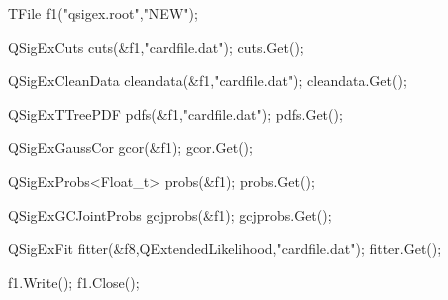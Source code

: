 \begin{boxedverbatim}
TFile f1("qsigex.root","NEW");

QSigExCuts cuts(&f1,"cardfile.dat"); 
cuts.Get();

QSigExCleanData cleandata(&f1,"cardfile.dat");
cleandata.Get();

QSigExTTreePDF pdfs(&f1,"cardfile.dat");
pdfs.Get();

QSigExGaussCor gcor(&f1);
gcor.Get();

QSigExProbs<Float_t> probs(&f1);
probs.Get();

QSigExGCJointProbs gcjprobs(&f1); 
gcjprobs.Get();

QSigExFit fitter(&f8,QExtendedLikelihood,"cardfile.dat");
fitter.Get();

f1.Write();
f1.Close();

\end{boxedverbatim}

